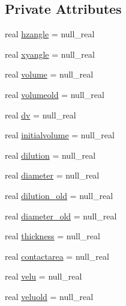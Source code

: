 \subsection*{Private Attributes}
\begin{DoxyCompactItemize}
\item 
real \mbox{\hyperlink{structmodulejet_1_1t__evolution_a2a97e244e4c9b38184a86c9c51bac999}{hzangle}} = null\+\_\+real
\item 
real \mbox{\hyperlink{structmodulejet_1_1t__evolution_aa70a36b334a60edc66eae5b5143b3c4e}{xyangle}} = null\+\_\+real
\item 
real \mbox{\hyperlink{structmodulejet_1_1t__evolution_a2c22dfa58b46ccf7d5d761a3dd78d28a}{volume}} = null\+\_\+real
\item 
real \mbox{\hyperlink{structmodulejet_1_1t__evolution_ad20a485acb17949ced5431d4e3594ced}{volumeold}} = null\+\_\+real
\item 
real \mbox{\hyperlink{structmodulejet_1_1t__evolution_a4ce40665e71ba3a7f8dbeaca56032545}{dv}} = null\+\_\+real
\item 
real \mbox{\hyperlink{structmodulejet_1_1t__evolution_aab623660071c46a50e3856a25ddb0df4}{initialvolume}} = null\+\_\+real
\item 
real \mbox{\hyperlink{structmodulejet_1_1t__evolution_acd84ea3a71a7e5ea4e997abb1cb00a81}{dilution}} = null\+\_\+real
\item 
real \mbox{\hyperlink{structmodulejet_1_1t__evolution_afab7d91df2bd1b6cb6e88198eb5de2bb}{diameter}} = null\+\_\+real
\item 
real \mbox{\hyperlink{structmodulejet_1_1t__evolution_a67e7c84a1c6e87758468d8baf1fdd267}{dilution\+\_\+old}} = null\+\_\+real
\item 
real \mbox{\hyperlink{structmodulejet_1_1t__evolution_a11b929285c56b9875cc66774400cdfa2}{diameter\+\_\+old}} = null\+\_\+real
\item 
real \mbox{\hyperlink{structmodulejet_1_1t__evolution_aff3045db0d887e62c85f55472d688ffd}{thickness}} = null\+\_\+real
\item 
real \mbox{\hyperlink{structmodulejet_1_1t__evolution_a0540c8841d8999299721b1caa1d60ff5}{contactarea}} = null\+\_\+real
\item 
real \mbox{\hyperlink{structmodulejet_1_1t__evolution_a4253d52c76cc83def801b94fa4d06cdd}{velu}} = null\+\_\+real
\item 
real \mbox{\hyperlink{structmodulejet_1_1t__evolution_a1f05799342a01b5741dff53df66a43ec}{veluold}} = null\+\_\+real
\item 

\end{DoxyCompactItemize}
